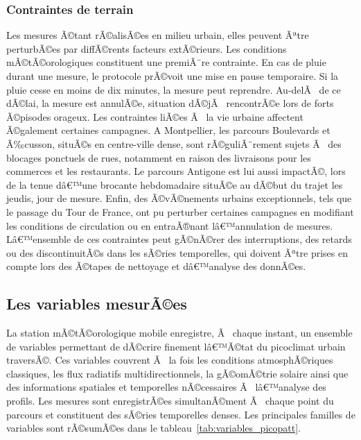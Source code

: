 \documentclass{article}
\begin{document}
\subsubsection{Contraintes de terrain}
\label{sec:contraintes_terrain}
Les mesures Ã©tant rÃ©alisÃ©es en milieu urbain, elles peuvent Ãªtre perturbÃ©es par diffÃ©rents facteurs extÃ©rieurs. Les conditions mÃ©tÃ©orologiques constituent une premiÃ¨re contrainte. En cas de pluie durant une mesure, le protocole prÃ©voit une mise en pause temporaire. Si la pluie cesse en moins de dix minutes, la mesure peut reprendre. Au-delÃ  de ce dÃ©lai, la mesure est annulÃ©e, situation dÃ©jÃ  rencontrÃ©e lors de forts Ã©pisodes orageux. Les contraintes liÃ©es Ã  la vie urbaine affectent Ã©galement certaines campagnes. A Montpellier, les parcours Boulevards et Ã‰cusson, situÃ©s en centre-ville dense, sont rÃ©guliÃ¨rement sujets Ã  des blocages ponctuels de rues, notamment en raison des livraisons pour les commerces et les restaurants. Le parcours Antigone est lui aussi impactÃ©, lors de la tenue dâ€™une brocante hebdomadaire situÃ©e au dÃ©but du trajet les jeudis, jour de mesure. Enfin, des Ã©vÃ©nements urbains exceptionnels, tels que le passage du Tour de France, ont pu perturber certaines campagnes en modifiant les conditions de circulation ou en entraÃ®nant lâ€™annulation de mesures. Lâ€™ensemble de ces contraintes peut gÃ©nÃ©rer des interruptions, des retards ou des discontinuitÃ©s dans les sÃ©ries temporelles, qui doivent Ãªtre prises en compte lors des Ã©tapes de nettoyage et dâ€™analyse des donnÃ©es.

\newpage

\subsection{Les variables mesurÃ©es}

La station mÃ©tÃ©orologique mobile enregistre, Ã  chaque instant, un ensemble de variables permettant de dÃ©crire finement lâ€™Ã©tat du picoclimat urbain traversÃ©. Ces variables couvrent Ã  la fois les conditions atmosphÃ©riques classiques, les flux radiatifs multidirectionnels, la gÃ©omÃ©trie solaire ainsi que des informations spatiales et temporelles nÃ©cessaires Ã  lâ€™analyse des profils. Les mesures sont enregistrÃ©es simultanÃ©ment Ã  chaque point du parcours et constituent des sÃ©ries temporelles denses. Les principales familles de variables sont rÃ©sumÃ©es dans le tableau~\ref{tab:variables_picopatt}.

\vspace{0.2cm}
\end{document}
